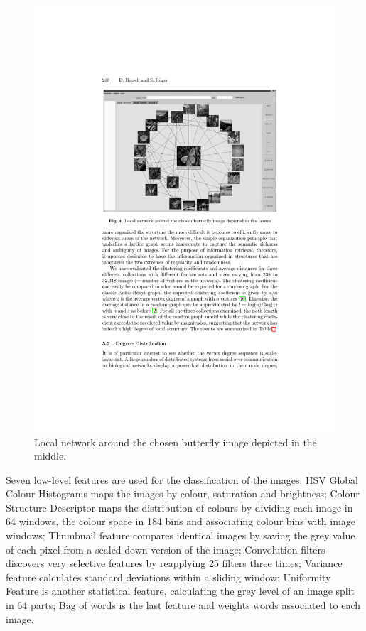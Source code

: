 \begin{figure}[ht]
	\centering
		\includegraphics[scale=1]{imgs/Heesch-2004p2675}
	\caption{Local network around the chosen butterfly image depicted in the middle.}
	\label{fig:heesch1}
\end{figure}

Seven low-level features are used for the classification of the images. HSV Global Colour Histograms maps the images by colour, saturation and brightness; Colour Structure Descriptor maps the distribution of colours by dividing each image in 64 windows, the colour space in 184 bins and associating colour bins with image windows; Thumbnail feature compares identical images by saving the grey value of each pixel from a scaled down version of the image; Convolution filters discovers very selective features by reapplying 25 filters three times; Variance feature calculates standard deviations within a sliding window; Uniformity Feature is another statistical feature, calculating the grey level of an image split in 64 parts; Bag of words is the last feature and weights words associated to each image.

